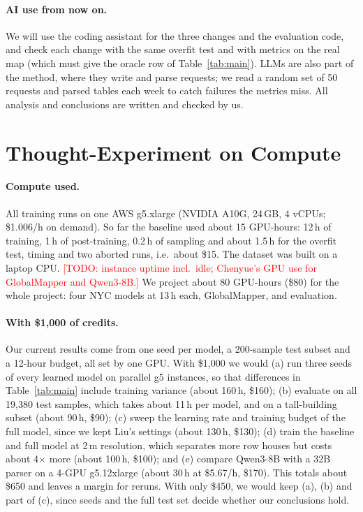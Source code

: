 \documentclass[twocolumn,11pt]{article}
\newcommand{\todo}[1]{\textcolor{red}{[TODO: #1]}}
\begin{document}
\paragraph{AI use from now on.} We will use the coding assistant for the three changes and the evaluation code, and check each change with the same overfit test and with metrics on the real map (which must give the oracle row of Table~\ref{tab:main}). LLMs are also part of the method, where they write and parse requests; we read a random set of 50 requests and parsed tables each week to catch failures the metrics miss. All analysis and conclusions are written and checked by us.

\section{Thought-Experiment on Compute}
\paragraph{Compute used.} All training runs on one AWS g5.xlarge (NVIDIA A10G, 24\,GB, 4 vCPUs; \$1.006/h on demand). So far the baseline used about 15 GPU-hours: 12\,h of training, 1\,h of post-training, 0.2\,h of sampling and about 1.5\,h for the overfit test, timing and two aborted runs, i.e.\ about \$15. The dataset was built on a laptop CPU. \todo{instance uptime incl.\ idle; Chenyue's GPU use for GlobalMapper and Qwen3-8B.} We project about 80 GPU-hours (\$80) for the whole project: four NYC models at 13\,h each, GlobalMapper, and evaluation.

\paragraph{With \$1,000 of credits.} Our current results come from one seed per model, a 200-sample test subset and a 12-hour budget, all set by one GPU. With \$1,000 we would (a) run three seeds of every learned model on parallel g5 instances, so that differences in Table~\ref{tab:main} include training variance (about 160\,h, \$160); (b) evaluate on all 19,380 test samples, which takes about 11\,h per model, and on a tall-building subset (about 90\,h, \$90); (c) sweep the learning rate and training budget of the full model, since we kept Liu's settings (about 130\,h, \$130); (d) train the baseline and full model at 2\,m resolution, which separates more row houses but costs about 4$\times$ more (about 100\,h, \$100); and (e) compare Qwen3-8B with a 32B parser on a 4-GPU g5.12xlarge (about 30\,h at \$5.67/h, \$170). This totals about \$650 and leaves a margin for reruns. With only \$450, we would keep (a), (b) and part of (c), since seeds and the full test set decide whether our conclusions hold.



\end{document}
